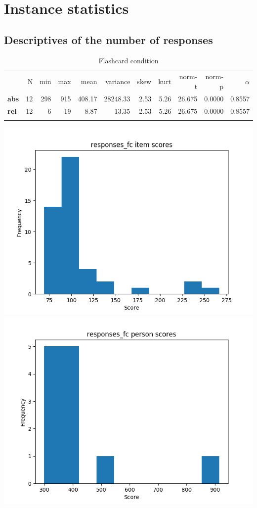 \chapter{Instance statistics}

\section{Descriptives of the number of responses}

\begin{longtable}[c]{@{}lrrrrrrrrrr@{}}
\caption{Flashcard condition}
\endfirsthead
\endhead
\toprule\addlinespace
& N & min & max & mean & variance & skew & kurt & norm-t &
norm-p & $\alpha$
\\\addlinespace
\midrule
\textbf{abs} & 12 & 298 & 915 & 408.17 & 28248.33 & 2.53 & 5.26 & 26.675
& 0.0000 & 0.8557
\\\addlinespace
\textbf{rel} & 12 & 6 & 19 & 8.87 & 13.35 & 2.53 & 5.26 & 26.675 &
0.0000 & 0.8557
\\\addlinespace
\bottomrule
\end{longtable}

\includegraphics{img/responses_fc_diff.png}
\includegraphics{img/responses_fc_abil.png}

